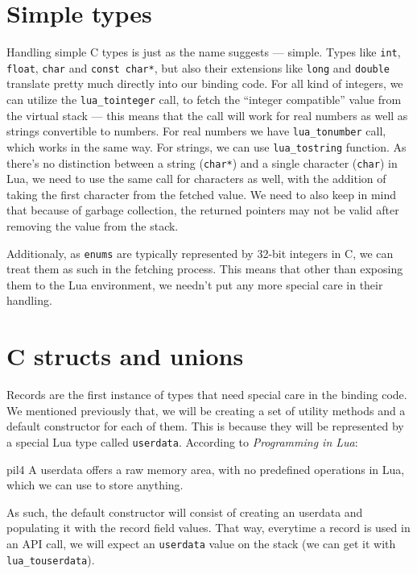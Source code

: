 \documentclass[polish, english]{iithesis}
\begin{document}
  \section{Simple types}
    Handling simple C types is just as the name suggests --- simple.
    Types like \texttt{int}, \texttt{float}, \texttt{char} and \texttt{const char*}, but also their extensions like \texttt{long} and \texttt{double} translate pretty much directly into our binding code.
    For all kind of integers, we can utilize the \texttt{lua\_tointeger} call, to fetch the ``integer compatible'' value from the virtual stack --- this means that the call will work for real numbers as well as strings convertible to numbers.
    For real numbers we have \texttt{lua\_tonumber} call, which works in the same way.
    For strings, we can use \texttt{lua\_tostring} function. 
    As there's no distinction between a string (\texttt{char*}) and a single character (\texttt{char}) in Lua, we need to use the same call for characters as well, with the addition of taking the first character from the fetched value.
    We need to also keep in mind that because of garbage collection, the returned pointers may not be valid after removing the value from the stack.

    Additionaly, as \texttt{enums} are typically represented by 32-bit integers in C, we can treat them as such in the fetching process.
    This means that other than exposing them to the Lua environment, we needn't put any more special care in their handling.
  \section{C structs and unions}
    Records are the first instance of types that need special care in the binding code.
    We mentioned previously that, we will be creating a set of utility methods and a default constructor for each of them.
    This is because they will be represented by a special Lua type called \texttt{userdata}. 
    According to \textit{Programming in Lua}:
    \begin{displaycquote}{pil4}
      A userdata offers a raw memory area, with no predefined operations in Lua, which we can use to store anything. 
    \end{displaycquote}
    As such, the default constructor will consist of creating an userdata and populating it with the record field values.
    That way, everytime a record is used in an API call, we will expect an \texttt{userdata} value on the stack (we can get it with \texttt{lua\_touserdata}).
\end{document}
